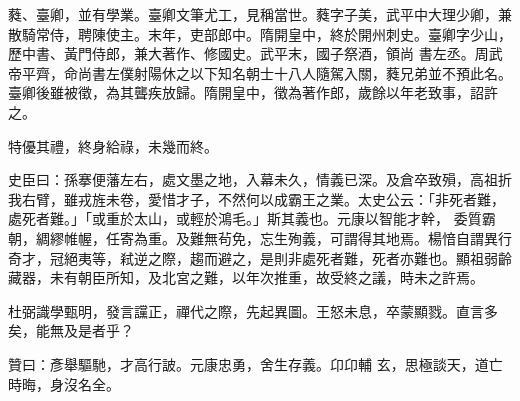 \begin{pinyinscope}
 蕤、臺卿，並有學業。臺卿文筆尤工，見稱當世。蕤字子美，武平中大理少卿，兼散騎常侍，聘陳使主。末年，吏部郎中。隋開皇中，終於開州刺史。臺卿字少山，歷中書、黃門侍郎，兼大著作、修國史。武平末，國子祭酒，領尚
 書左丞。周武帝平齊，命尚書左僕射陽休之以下知名朝士十八人隨駕入關，蕤兄弟並不預此名。臺卿後雖被徵，為其聾疾放歸。隋開皇中，徵為著作郎，歲餘以年老致事，詔許之。



 特優其禮，終身給祿，未幾而終。



 史臣曰：孫搴便藩左右，處文墨之地，入幕未久，情義已深。及倉卒致殞，高祖折我右臂，雖戎旌未卷，愛惜才子，不然何以成霸王之業。太史公云：「非死者難，處死者難。」「或重於太山，或輕於鴻毛。」斯其義也。元康以智能才幹，
 委質霸朝，綢繆帷幄，任寄為重。及難無茍免，忘生殉義，可謂得其地焉。楊愔自謂異行奇才，冠絕夷等，弒逆之際，趨而避之，是則非處死者難，死者亦難也。顯祖弱齡藏器，未有朝臣所知，及北宮之難，以年次推重，故受終之議，時未之許焉。



 杜弼識學甄明，發言讜正，禪代之際，先起異圖。王怒未息，卒蒙顯戮。直言多矣，能無及是者乎？



 贊曰：彥舉驅馳，才高行詖。元康忠勇，舍生存義。卬卬輔
 玄，思極談天，道亡時晦，身沒名全。






\end{pinyinscope}